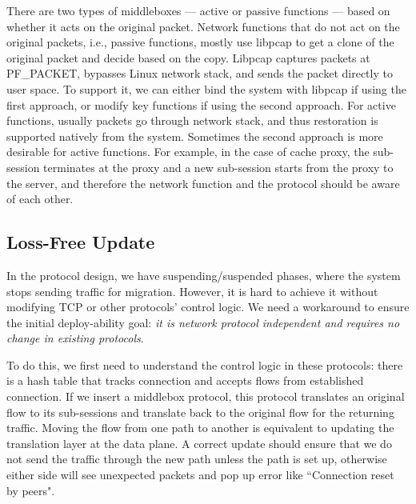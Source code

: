 There are two types of middleboxes --- active or passive functions --- based on whether it acts on the original packet. Network functions that do not act on the original packets, i.e., passive functions, mostly use libpcap to get a clone of the original packet and decide based on the copy. Libpcap captures packets at PF\_PACKET, bypasses Linux network stack, and sends the packet directly to user space. To support it, we can either bind the system with libpcap if using the first approach, or modify key functions if using the second approach.  For active functions, usually packets go through network stack, and thus restoration is supported natively from the system. Sometimes the second approach is more desirable for active functions. For example, in the case of cache proxy, the sub-session terminates at the proxy and a new sub-session starts from the proxy to the server, and therefore the network function and the protocol should be aware of each other. 

\subsection{Loss-Free Update}

In the protocol design, we have suspending/suspended phases, where the system stops sending traffic for migration. However, it is hard to achieve it without modifying TCP or other protocols' control logic. We need a workaround to ensure the initial deploy-ability goal: \textit{it is network protocol independent and requires no change in existing protocols}. 

To do this, we first need to understand the control logic in these protocols: there is a hash table that tracks connection and accepts flows from established connection. If we insert a middlebox protocol, this protocol translates an original flow to its sub-sessions and translate back to the original flow for the returning traffic. Moving the flow from one path to another is equivalent to updating the translation layer at the data plane. A correct update should ensure that we do not send the traffic through the new path unless the path is set up, otherwise either side will see unexpected packets and pop up error like ``\textsf{Connection reset by peers}". 

